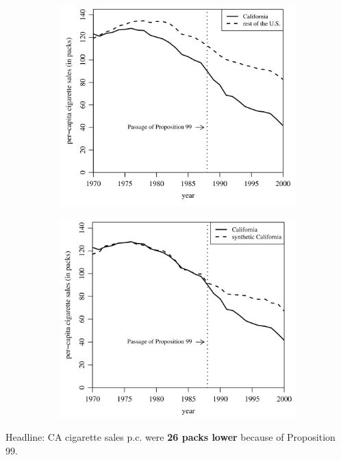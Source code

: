 \documentclass[notes,11pt, aspectratio=169]{beamer}
\begin{document}
\begin{frame}{}
    
    \begin{figure}
        \centering
        \begin{subfigure}{.45 \textwidth}
            \includegraphics[width = \linewidth]{figures/ca_row.png}
        \end{subfigure} 
        \begin{subfigure}{.45 \textwidth}
            \includegraphics[width = \linewidth]{figures/ca_synthca.png}
        \end{subfigure}
    \end{figure}
    
    Headline: CA cigarette sales p.c. were \textbf{26 packs lower} because of Proposition 99. 
    
\end{frame}
\end{document}

